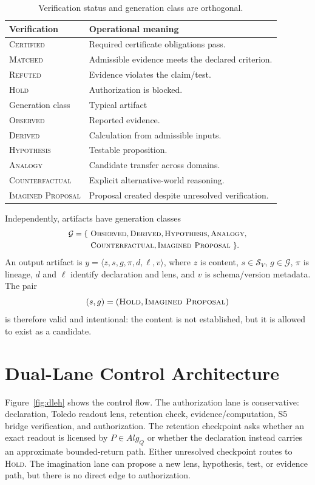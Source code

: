 \documentclass[10pt,twocolumn]{article}
\begin{document}
\begin{table}[t]
\centering\small
\caption{Verification status and generation class are orthogonal.}
\begin{tabular}{@{}ll@{}}
\toprule
Verification & Operational meaning\\
\midrule
\textsc{Certified} & Required certificate obligations pass.\\
\textsc{Matched} & Admissible evidence meets the declared criterion.\\
\textsc{Refuted} & Evidence violates the claim/test.\\
\textsc{Hold} & Authorization is blocked.\\
\midrule
Generation class & Typical artifact\\
\midrule
\textsc{Observed} & Reported evidence.\\
\textsc{Derived} & Calculation from admissible inputs.\\
\textsc{Hypothesis} & Testable proposition.\\
\textsc{Analogy} & Candidate transfer across domains.\\
\textsc{Counterfactual} & Explicit alternative-world reasoning.\\
\textsc{Imagined Proposal} & Proposal created despite unresolved verification.\\
\bottomrule
\end{tabular}
\end{table}

Independently, artifacts have generation classes
\begin{equation}
\small
\begin{aligned}
\mathcal G = \{\ &\textsc{Observed}, \textsc{Derived}, \textsc{Hypothesis}, \textsc{Analogy},\\
&\textsc{Counterfactual}, \textsc{Imagined Proposal}\ \}.
\end{aligned}
\end{equation}
An output artifact is $y = \langle z, s, g, \pi, d, \ell, v\rangle$, where $z$ is content, $s \in \mathcal S_V$, $g \in \mathcal G$, $\pi$ is lineage, $d$ and $\ell$ identify declaration and lens, and $v$ is schema/version metadata. The pair
\begin{equation}
(s,g) = (\textsc{Hold}, \textsc{Imagined Proposal})
\end{equation}
is therefore valid and intentional: the content is not established, but it is allowed to exist as a candidate.

\section{Dual-Lane Control Architecture}
Figure~\ref{fig:dleh} shows the control flow. The authorization lane is conservative: declaration, Toledo readout lens, retention check, evidence/computation, S5 bridge verification, and authorization. The retention checkpoint asks whether an exact readout is licensed by $P \in Alg_Q$ or whether the declaration instead carries an approximate bounded-return path. Either unresolved checkpoint routes to \textsc{Hold}. The imagination lane can propose a new lens, hypothesis, test, or evidence path, but there is no direct edge to authorization.
\end{document}
